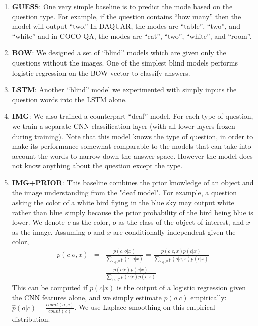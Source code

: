 \documentclass{article}
\renewcommand{\#}[1]{\textbf{#1}}
\begin{document}
\begin{enumerate}[leftmargin=*]
\item \#{GUESS}:
One very simple baseline is to predict the mode based on the question type. For
example, if the question contains ``how many'' then the model will output
``two.'' In DAQUAR, the modes are ``table'', ``two'', and ``white'' and in
COCO-QA, the modes are ``cat'', ``two'', ``white'', and ``room''.

\item \#{BOW}:
We designed a set of ``blind'' models which
are given only the questions without the images. One of the simplest blind 
models performs logistic regression on the BOW vector to classify answers.

\item \#{LSTM}:
Another ``blind'' model we experimented with simply inputs the question words into
the LSTM alone.  

\item \#{IMG}:
We also trained a counterpart ``deaf'' model.
For each type of question, we train a separate CNN classification layer (with all
lower layers frozen during training). Note that this model knows the type
of question, in order to make its performance somewhat comparable to the
models that can take into account the words to narrow down the answer space.
However the model does not know anything about the question except the type. 

\item \#{IMG+PRIOR}:
This baseline combines the prior
knowledge of an object and the image understanding from the "deaf model". 
For example, a question
asking the color of a white bird flying in the blue sky may output
white rather than blue simply because 
the prior probability of the bird being blue is lower. 
We denote $c$ as the color,
$o$ as the class of the object of interest, and $x$ as the image. 
Assuming $o$ and $x$ are conditionally independent given the color,
\begin{equation}
\begin{array}{lll}
p(c | o, x) & = & \frac{p(c, o | x)}{\sum_{c \in \mathcal{C}} p(c, o | x)} = \frac{p(o | c, x) p(c | x)}{\sum_{c \in \mathcal{C}} p(o | c, x) p(c | x)} \\
& = & \frac{p(o | c) p(c | x)}{\sum_{c \in \mathcal{C}}p(o | c) p(c | x)}
\end{array}
\end{equation}
This can be computed if $p(c | x)$ is the output of a
logistic regression given the CNN features alone, and
we simply estimate $p(o | c)$ empirically:
$\hat{p}(o | c) = \frac{count(o, c)}{count(c)}$.
We use Laplace smoothing on this empirical distribution.
\end{enumerate}
\end{document}
